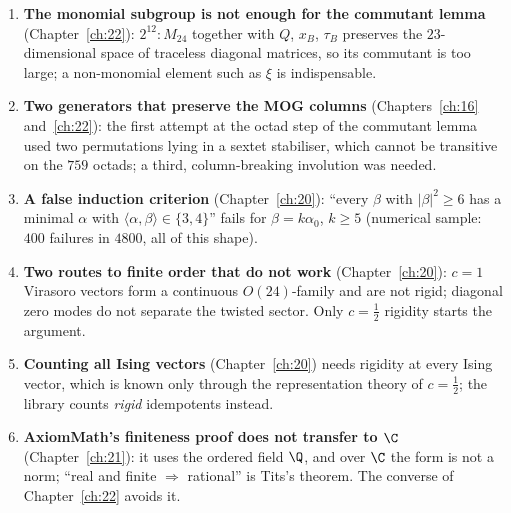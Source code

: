 \begin{enumerate}
  self-normalising; it cannot exclude a finite overgroup. Also recorded there: ``real first, then real $\Rightarrow$
  rational'' needs Tits's theorem, and was superseded.
\item \textbf{The monomial subgroup is not enough for the commutant lemma} (Chapter~\ref{ch:22}): $2^{12}{:}M_{24}$
  together with $Q$, $x_B$, $\tau_B$ preserves the $23$-dimensional space of traceless diagonal matrices, so its commutant
  is too large; a non-monomial element such as $\xi$ is indispensable.
\item \textbf{Two generators that preserve the MOG columns} (Chapters~\ref{ch:16} and~\ref{ch:22}): the first attempt at
  the octad step of the commutant lemma used two permutations lying in a sextet stabiliser, which cannot be transitive on
  the $759$ octads; a third, column-breaking involution was needed.
\item \textbf{A false induction criterion} (Chapter~\ref{ch:20}): ``every $\beta$ with $|\beta|^2\ge6$ has a minimal
  $\alpha$ with $\langle\alpha,\beta\rangle\in\{3,4\}$'' fails for $\beta=k\alpha_0$, $k\ge5$ (numerical sample: $400$
  failures in $4800$, all of this shape).
\item \textbf{Two routes to finite order that do not work} (Chapter~\ref{ch:20}): $c=1$ Virasoro vectors form a continuous
  $O(24)$-family and are not rigid; diagonal zero modes do not separate the twisted sector. Only $c=\tfrac12$ rigidity
  starts the argument.
\item \textbf{Counting all Ising vectors} (Chapter~\ref{ch:20}) needs rigidity at every Ising vector, which is known only
  through the representation theory of $c=\tfrac12$; the library counts \emph{rigid} idempotents instead.
\item \textbf{AxiomMath's finiteness proof does not transfer to $\C$} (Chapter~\ref{ch:21}): it uses the ordered field
  $\Q$, and over $\C$ the form is not a norm; ``real and finite $\Rightarrow$ rational'' is Tits's theorem. The converse
  of Chapter~\ref{ch:22} avoids it.
\end{enumerate}


